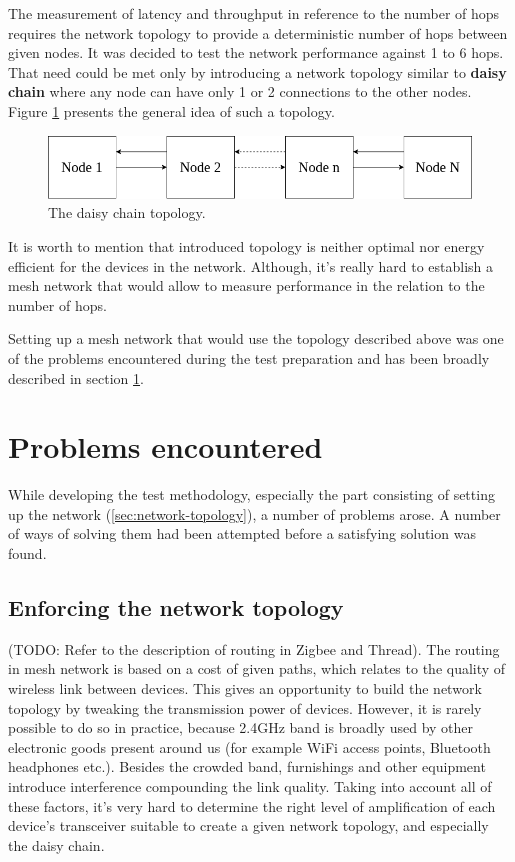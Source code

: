 The measurement of latency and throughput in reference to the number of hops requires the network topology
to provide a deterministic number of hops between given nodes. It was decided to test the network performance
against 1 to 6 hops. That need could be met only by introducing a network topology similar to \textbf{daisy 
chain} where any node can have only 1 or 2 connections to the other nodes. Figure \ref{fig:daisy_chain} 
presents the general idea of such a topology.

\medskip
\begin{figure}[H]
    \centering
    \includegraphics[scale=0.6]{images/daisy-chain.png}
    \caption{The daisy chain topology.}
    \label{fig:daisy_chain}
\end{figure}

It is worth to mention that introduced topology is neither optimal nor energy 
efficient for the devices in the network. Although, it's really hard to 
establish a mesh network that would allow to measure performance in the relation
to the number of hops. 

Setting up a mesh network that would use the topology described above was one
of the problems encountered during the test preparation and has been broadly
described in section \ref{sec:problems-encountered}.

\medskip
\section{Problems encountered}
\label{sec:problems-encountered}

While developing the test methodology, especially the part consisting of
setting up the network (\ref{sec:network-topology}), a number of problems 
arose. A number of ways of solving them had been attempted before a satisfying 
solution was found.

\subsection{Enforcing the network topology}

(TODO: Refer to the description of routing in Zigbee and Thread). The
routing in mesh network is based on a cost of given paths, which 
relates to the quality of wireless link between devices. This gives an 
opportunity to build the network topology by tweaking the transmission power
of devices. However, it is rarely possible to do so in practice, because 2.4GHz 
band is broadly used by other electronic goods present around us (for example 
WiFi access points, Bluetooth headphones etc.). Besides the crowded band, 
furnishings and other equipment introduce interference compounding the link
quality. Taking into account all of these factors, it's very hard to determine
the right level of amplification of each device's transceiver suitable to create
a given network topology, and especially the daisy chain.

